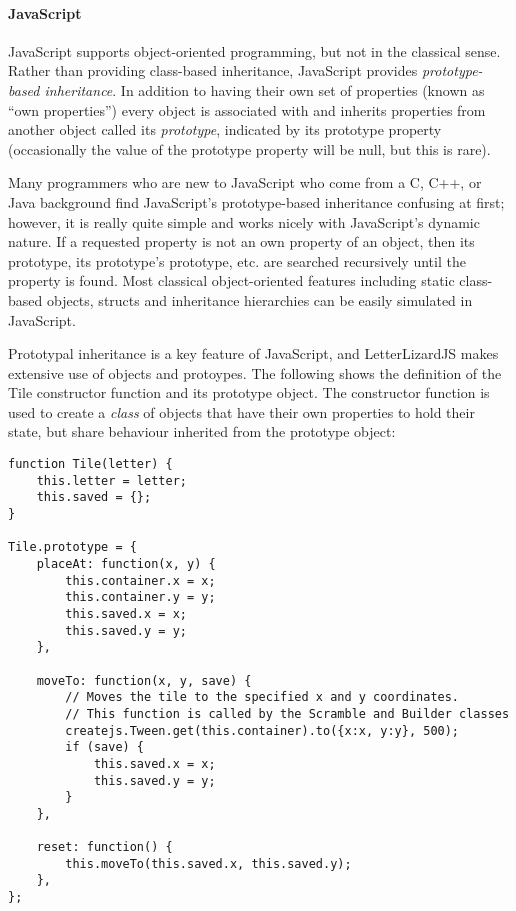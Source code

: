 \paragraph{JavaScript}
JavaScript supports object-oriented programming, but not in the classical
sense. Rather than providing class-based inheritance, JavaScript provides
\emph{prototype-based inheritance}. In addition to having their own set of 
properties (known as ``own properties'') every object is associated with and
inherits properties from another object called its \emph{prototype},
indicated by its prototype property (occasionally the value of the prototype
property will be null, but this is rare). 

Many programmers who are new to JavaScript who come from a
C, C++, or Java background find JavaScript's prototype-based inheritance
confusing at first; however, it is really quite simple and works nicely with 
JavaScript's dynamic nature. If a requested property is not an own property
of an object, then its prototype, its prototype's prototype, etc. are searched
recursively until the property is found. Most classical object-oriented features
including static class-based objects, structs and inheritance hierarchies can be
easily simulated in JavaScript. 

Prototypal inheritance is a key feature of JavaScript, and LetterLizardJS makes
extensive use of objects and protoypes. The following shows the definition
of the Tile constructor function and its prototype object. The constructor function
is used to create a \emph{class} of objects that have their own properties to
hold their state, but share behaviour inherited from the prototype object:

\begin{lstlisting}[caption=A class definition in JavaScript]
function Tile(letter) {
	this.letter = letter;
	this.saved = {};
}

Tile.prototype = {
	placeAt: function(x, y) {
		this.container.x = x;
		this.container.y = y;
		this.saved.x = x;
		this.saved.y = y;
	},

	moveTo: function(x, y, save) {
		// Moves the tile to the specified x and y coordinates.
		// This function is called by the Scramble and Builder classes
		createjs.Tween.get(this.container).to({x:x, y:y}, 500);
		if (save) {
			this.saved.x = x;
			this.saved.y = y;
		}
	},

	reset: function() {
		this.moveTo(this.saved.x, this.saved.y);
	},
};
\end{lstlisting}

